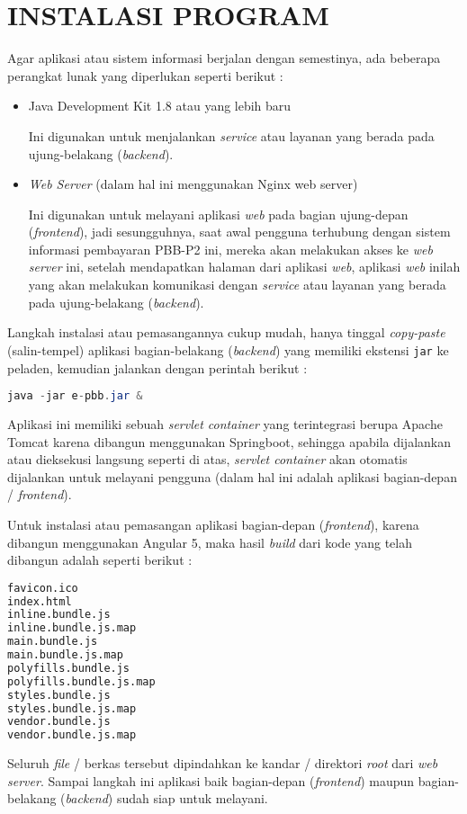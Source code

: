 \chapter{INSTALASI PROGRAM}

Agar aplikasi atau sistem informasi berjalan dengan semestinya, ada beberapa perangkat lunak yang diperlukan seperti berikut :

\begin{itemize}
	\item Java Development Kit 1.8 atau yang lebih baru
	
Ini digunakan untuk menjalankan \textit{service} atau layanan yang berada pada ujung-belakang (\textit{backend}).	
	
	\item \textit{Web Server} (dalam hal ini menggunakan Nginx web server)
	
Ini digunakan untuk melayani aplikasi \textit{web} pada bagian ujung-depan (\textit{frontend}), jadi sesungguhnya, saat awal pengguna terhubung dengan sistem informasi pembayaran PBB-P2 ini, mereka akan melakukan akses ke \textit{web server} ini, setelah mendapatkan halaman dari aplikasi \textit{web}, aplikasi \textit{web} inilah yang akan melakukan komunikasi dengan \textit{service} atau layanan yang berada pada ujung-belakang (\textit{backend}).
\end{itemize}

Langkah instalasi atau pemasangannya cukup mudah, hanya tinggal \textit{copy-paste} (salin-tempel) aplikasi bagian-belakang (\textit{backend}) yang memiliki ekstensi \texttt{jar} ke peladen, kemudian jalankan dengan perintah berikut :

\begin{lstlisting}[language=java]
java -jar e-pbb.jar &
\end{lstlisting}

Aplikasi ini memiliki sebuah \textit{servlet container} yang terintegrasi berupa Apache Tomcat karena dibangun menggunakan Springboot, sehingga apabila dijalankan atau dieksekusi langsung seperti di atas, \textit{servlet container} akan otomatis dijalankan untuk melayani pengguna (dalam hal ini adalah aplikasi bagian-depan / \textit{frontend}).

Untuk instalasi atau pemasangan aplikasi bagian-depan (\textit{frontend}), karena dibangun menggunakan Angular 5, maka hasil \textit{build} dari kode yang telah dibangun adalah seperti berikut :

\begin{lstlisting}[language=sh]
favicon.ico
index.html
inline.bundle.js
inline.bundle.js.map
main.bundle.js
main.bundle.js.map
polyfills.bundle.js
polyfills.bundle.js.map
styles.bundle.js
styles.bundle.js.map
vendor.bundle.js
vendor.bundle.js.map
\end{lstlisting}

Seluruh \textit{file} / berkas tersebut dipindahkan ke kandar / direktori \textit{root} dari \textit{web server}. Sampai langkah ini aplikasi baik bagian-depan (\textit{frontend}) maupun bagian-belakang (\textit{backend}) sudah siap untuk melayani.